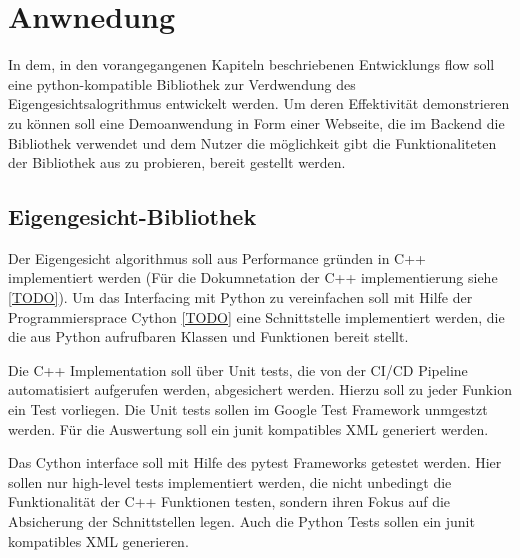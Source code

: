 \chapter{Anwnedung}

In dem, in den vorangegangenen Kapiteln beschriebenen Entwicklungs flow soll eine python-kompatible Bibliothek zur Verdwendung des Eigengesichtsalogrithmus entwickelt werden. Um deren Effektivität demonstrieren zu können soll eine Demoanwendung in Form einer Webseite, die im Backend die Bibliothek verwendet und dem Nutzer die möglichkeit gibt die Funktionaliteten der Bibliothek aus zu probieren, bereit gestellt werden.

\section{Eigengesicht-Bibliothek}

Der Eigengesicht algorithmus soll aus Performance gründen in C++ implementiert werden (Für die Dokumnetation der C++ implementierung siehe \ref{TODO}). Um das Interfacing mit Python zu vereinfachen soll mit Hilfe der Programmiersprace Cython \ref{TODO} eine Schnittstelle implementiert werden, die die aus Python aufrufbaren Klassen und Funktionen bereit stellt.

Die C++ Implementation soll über Unit tests, die von der CI/CD Pipeline automatisiert aufgerufen werden, abgesichert werden. Hierzu soll zu jeder Funkion ein Test vorliegen. Die Unit tests sollen im Google Test Framework unmgestzt werden. Für die Auswertung soll ein junit kompatibles XML generiert werden.

Das Cython interface soll mit Hilfe des pytest Frameworks getestet werden. Hier sollen nur high-level tests implementiert werden, die nicht unbedingt die Funktionalität der C++ Funktionen testen, sondern ihren Fokus auf die Absicherung der Schnittstellen legen. Auch die Python Tests sollen ein junit kompatibles XML generieren.